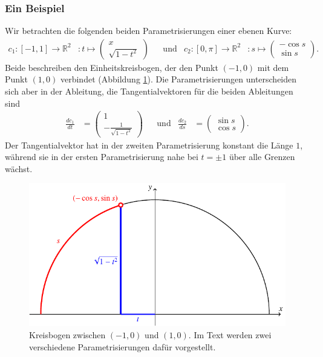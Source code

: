 \subsubsection{Ein Beispiel}
Wir betrachten die folgenden beiden Parametrisierungen einer ebenen Kurve:
\begin{equation}
\begin{aligned}
c_1\colon
[-1,1]\to\mathbb{R}^2
&\colon
t\mapsto\begin{pmatrix}x\\\sqrt{1-t^2}\end{pmatrix}
&&\text{und}&
c_2\colon
[0,\pi]\to\mathbb{R}^2
&
\colon
s\mapsto\begin{pmatrix}-\cos s\\\sin s\end{pmatrix}.
\end{aligned}
\end{equation}
Beide beschreiben den Einheitskreisbogen, der den Punkt $(-1,0)$ mit
dem Punkt $(1,0)$ verbindet (Abbildung \ref{skript:1dim:kreisbogen}).
Die Parametrisierungen unterscheiden sich aber in der Ableitung,
die Tangentialvektoren für die beiden Ableitungen sind
\begin{equation}
\begin{aligned}
\frac{dc_1}{dt}
&=
\begin{pmatrix}
1\\-\frac{1}{\sqrt{1-t^2}}
\end{pmatrix}
&&\text{und}&
\frac{dc_2}{ds}
&=
\begin{pmatrix}
\sin s\\\cos s
\end{pmatrix}.
\end{aligned}
\end{equation}
Der Tangentialvektor hat in der zweiten Parametrisierung konstant
die Länge $1$, während sie in der ersten Parametrisierung nahe bei
$t=\pm1$ über alle Grenzen wächst.
\begin{figure}
\centering
\includegraphics{chapters/tikz/kreisbogen.pdf}
\caption{Kreisbogen zwischen $(-1,0)$ und $(1,0)$. Im Text werden
zwei verschiedene Parametrisierungen dafür vorgestellt.
\label{skript:1dim:kreisbogen}}
\end{figure}

